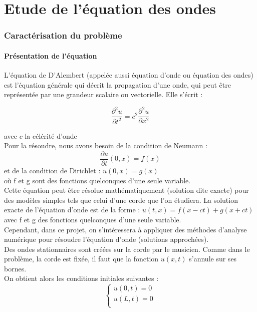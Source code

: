 \part{Etude de l'équation des ondes}

\section{Caractérisation du problème}

\subsection{Présentation de l'équation}

L'équation de D'Alembert (appelée aussi équation d'onde ou équation des ondes) est l'équation générale qui décrit la propagation d'une onde, qui peut être représentée par une grandeur scalaire ou vectorielle. 
Elle s'écrit : 

\begin{equation*}
\frac{\partial^2u}{\partial t^2} = c^{2}\frac{\partial^2u}{\partial x^2}
\end{equation*}
 
    avec $c$ la célérité d'onde \\
Pour la résoudre, nous avons besoin de la condition de Neumann :
\begin{equation*}
\frac{\partial u}{\partial t} (0,x) = f(x)
\end{equation*}
et de la condition de Dirichlet : $u(0,x) = g(x)$\\
où f et g sont des fonctions quelconques d'une seule variable.\\

Cette équation peut être résolue mathématiquement (solution dite exacte) pour des modèles simples tels que celui d'une corde que l'on étudiera. La solution exacte de l'équation d'onde est de la forme :
$u(t,x) = f(x-ct) + g(x+ct)$ avec f et g des fonctions quelconques d'une seule variable.  \\

Cependant, dans ce projet, on s'intéressera à appliquer des méthodes d'analyse numérique pour résoudre l'équation d'onde (solutions approchées).\\

Des ondes stationnaires sont créées sur la corde par le musicien. Comme dans le problème, la corde est fixée, il faut que la fonction $u(x,t)$ s'annule sur ses bornes.\\
On obtient alors les conditions initiales suivantes :\\
\begin{equation*}
\left \{
\begin{array}{rcl}
u(0,t)=0\\
u(L,t)=0\\
\end{array}
\right.
\end{equation*}\\


